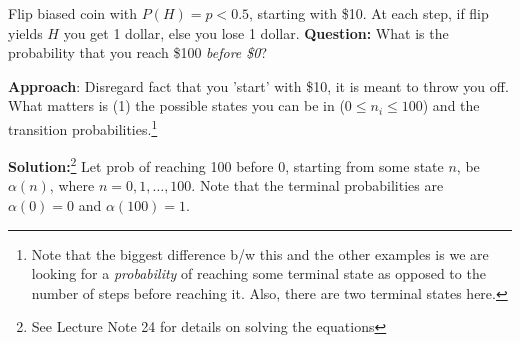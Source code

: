 \documentclass[12pt]{article}
\newcommand{\myspace}{\vspace{2\bigskipamount}}
\newcommand\p{\Needspace{12\baselineskip} \noindent}
\begin{document}
\myspace
\p {} Flip biased coin with $P(H) = p < 0.5$, starting with \$10. At each step, if flip yields $H$ you get 1 dollar, else you lose 1 dollar. \textbf{Question:} What is the probability that you reach \$100 \textit{before \$0}?
\begin{compactitem}
	\item \textbf{Approach}: Disregard fact that you 'start' with \$10, it is meant to throw you off. What matters is (1) the possible states you can be in ($0 \le n_i \le 100$) and the transition probabilities.\footnote{Note that the biggest difference b/w this and the other examples is we are looking for a \textit{probability} of reaching some terminal state as opposed to the number of steps before reaching it. Also, there are two terminal states here.} 
	
	\item \textbf{Solution:}\footnote{See Lecture Note 24 for details on solving the equations} Let prob of reaching 100 before 0, starting from some state $n$, be $\alpha(n)$, where $n = 0, 1, \ldots, 100$. Note that the terminal probabilities are $\alpha(0) = 0$ and $\alpha(100) = 1$.
\end{compactitem}
\end{document}

